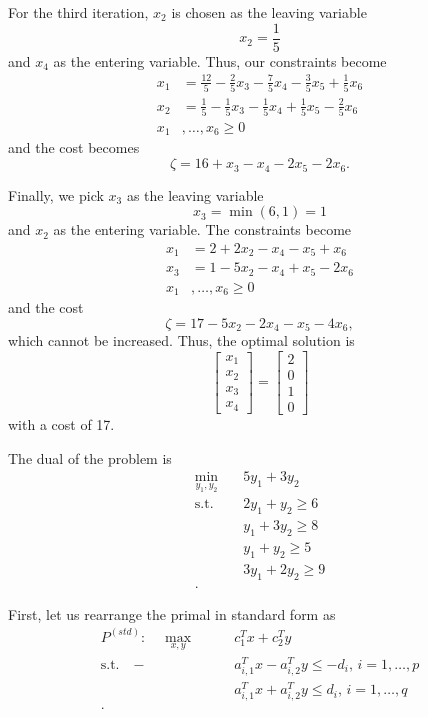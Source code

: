\documentclass[a4paper]{report}
\begin{document}
For the third iteration, $x_2$ is chosen as the leaving variable \[
x_2 = \frac{1}{5} 
\] and $x_4$ as the entering variable. Thus, our constraints become
\begin{align*}
    x_1 &= \frac{12}{5} - \frac{2}{5}x_3 -\frac{7}{5}x_4 -\frac{3}{5}x_5 + \frac{1}{5}x_6 \\
    x_2 &= \frac{1}{5} - \frac{1}{5}x_3 -\frac{1}{5}x_4 +\frac{1}{5}x_5 -\frac{2}{5}x_6  \\
    x_1&,\ldots,x_6 \ge 0
\end{align*}
and the cost becomes \[
\zeta = 16 + x_3 -x_4 -2x_5 -2x_6
.\] 

Finally, we pick $x_3$ as the leaving variable \[
x_3 = \min\left( 6, 1 \right) = 1
\] and $x_2$ as the entering variable. The constraints become
\begin{align*}
    x_1 &= 2 + 2x_2 -x_4 -x_5 +x_6 \\
    x_3 &= 1 - 5x_2 -x_4 +x_5 -2x_6  \\
    x_1&,\ldots,x_6 \ge 0
\end{align*}
and the cost \[
\zeta = 17 - 5x_2 -2x_4 -x_5 -4x_6
,\] which cannot be increased. Thus, the optimal solution is \[
\begin{bmatrix} x_1 \\ x_2 \\ x_3 \\ x_4 \end{bmatrix} = \begin{bmatrix} 2 \\ 0 \\ 1 \\ 0 \end{bmatrix} 
\] with a cost of 17.

The dual of the problem is
\begin{align*}
    \min_{y_1,y_2} \quad & 5y_1 + 3y_2 \\
    \textrm{s.t.} \quad & 2y_1 + y_2 \ge 6 \\
      & y_1+3y_2 \ge 8 \\
      & y_1+y_2 \ge 5 \\
      & 3y_1+2y_2 \ge 9 \\
.\end{align*}


First, let us rearrange the primal in standard form as
\begin{align*}
    P^{(std)}:\quad \max_{x,y} \quad\quad & c_1^{T}x+c_2^{T}y \\
    \textrm{s.t.} \quad -&a_{i,1}^{T} x -a_{i,2}^{T}y \le  -d_i,\,i=1,\ldots,p \\
			 &a_{i,1}^{T} x + a_{i,2}^{T}y \le d_i,\,i=1,\ldots,q \\
.\end{align*}
\end{document}
